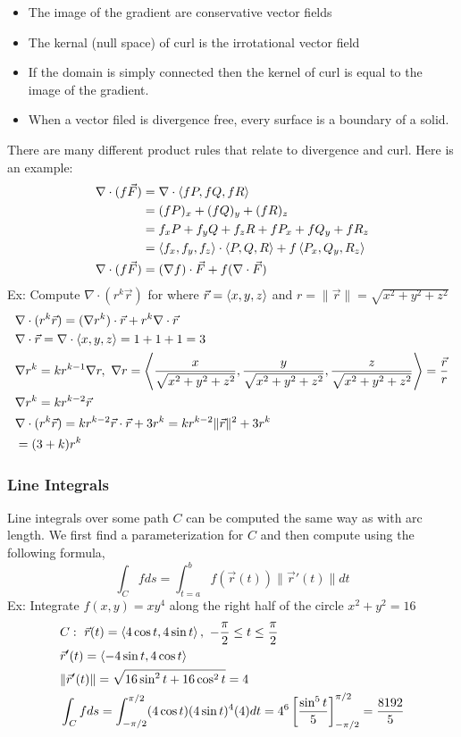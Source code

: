 \documentclass[11pt, fleqn]{article}
\begin{document}
\begin{itemize}
    \item The image of the gradient are conservative vector fields
    \item The kernal (null space) of curl is the irrotational vector field
    \item If the domain is simply connected then the kernel of curl is equal to the image of the gradient.
    \item When a vector filed is divergence free, every surface is a boundary of a solid.
\end{itemize}
There are many different product rules that relate to divergence and curl. Here is an example:
\begin{align*}
    \nabla\cdot(f\vec{F})&=\nabla\cdot\left\langle fP,fQ,fR \right\rangle\\
    &=(fP)_x+(fQ)_y+(fR)_z\\
    &=f_xP+f_yQ+f_zR+fP_x+fQ_y+fR_z\\
    &=\left\langle f_x,f_y,f_z \right\rangle\cdot\left\langle P,Q,R \right\rangle+f\left\langle P_x,Q_y,R_z \right\rangle\\
    \nabla\cdot(f\vec{F})&=(\nabla f)\cdot\vec{F}+f(\nabla\cdot\vec{F})
\end{align*}
Ex: Compute $\nabla\cdot(r^k\vec{r})$ for where $\vec{r}=\left\langle x,y,z \right\rangle$ and $r=\|\vec{r}\|=\sqrt{x^2+y^2+z^2}$
\begin{align*}
    &\nabla\cdot(r^k\vec{r})=(\nabla r^k)\cdot\vec{r}+r^k\nabla\cdot\vec{r}\\
    &\nabla\cdot\vec{r}=\nabla\cdot\left\langle x,y,z \right\rangle=1+1+1=3\\
    &\nabla r^k=kr^{k-1}\nabla r,\ \nabla r=\left\langle \frac{x}{\sqrt{x^2+y^2+z^2}},\frac{y}{\sqrt{x^2+y^2+z^2}},\frac{z}{\sqrt{x^2+y^2+z^2}} \right\rangle=\frac{\vec{r}}{r}\\
    &\nabla r^k=kr^{k-2}\vec{r}\\
    &\nabla\cdot(r^k\vec{r})=kr^{k-2}\vec{r}\cdot\vec{r}+3r^k=kr^{k-2}\|\vec{r}\|^2+3r^k\\
    &=(3+k)r^k
\end{align*}
\subsubsection{Line Integrals}
Line integrals over some path $C$ can be computed the same way as with arc length. We first find a parameterization for $C$ and then compute using the following formula,
$$\int_C fds=\int_{t=a}^b f(\vec{r}(t))\|\vec{r}'(t)\|dt$$
Ex: Integrate $f(x,y)=xy^4$ along the right half of the circle $x^2+y^2=16$\\
\begin{align*}
    &C:\ \vec{r}(t)=\left\langle 4\cos t,4\sin t \right\rangle,\ -\frac{\pi}{2}\leq t\leq \frac{\pi}{2}\\
    &\vec{r}'(t)=\left\langle -4\sin t,4\cos t \right\rangle\\
    &\|\vec{r}'(t)\|=\sqrt{16\sin^2t+16\cos^2t}=4\\
    &\int_C fds=\int_{-\pi/2}^{\pi/2}(4\cos t)(4\sin t)^4(4)dt=4^6\left[ \frac{\sin^5t}{5} \right]_{-\pi/2}^{\pi/2}=\frac{8192}{5}
\end{align*}
\end{document}
